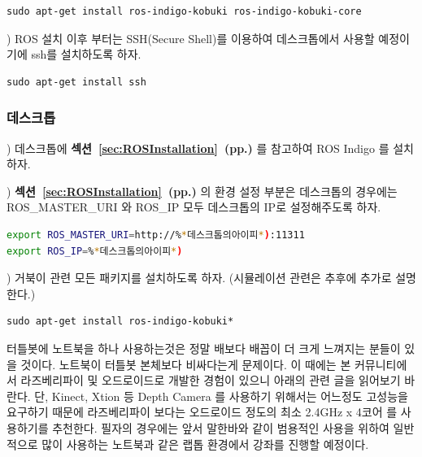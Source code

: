 \begin{lstlisting}[language=ROS]
sudo apt-get install ros-indigo-kobuki ros-indigo-kobuki-core
\end{lstlisting}

\vspace{\baselineskip}
\noindent{}
\thenum) ROS 설치 이후 부터는 SSH(Secure Shell)를 이용하여 데스크톱에서 사용할 예정이기에  ssh를 설치하도록 하자.

\begin{lstlisting}[language=ROS]
sudo apt-get install ssh
\end{lstlisting}

\subsubsection{데스크톱}

\vspace{\baselineskip}
\noindent{}
\thenum) 데스크톱에 \textbf{섹션~\ref{sec:ROSInstallation}~(pp.\pageref{sec:ROSInstallation})} 를 참고하여 ROS Indigo 를 설치하자. 

\vspace{\baselineskip}
\noindent{}
\thenum) \textbf{섹션~\ref{sec:ROSInstallation}~(pp.\pageref{sec:ROSInstallation})} 의 환경 설정 부분은 데스크톱의 경우에는 ROS\_MASTER\_URI 와 ROS\_IP 모두 데스크톱의 IP로 설정해주도록 하자. 

\begin{lstlisting}[language=bash]
export ROS_MASTER_URI=http://%*데스크톱의아이피*):11311
export ROS_IP=%*데스크톱의아이피*)
\end{lstlisting}

\vspace{\baselineskip}
\noindent{}
\thenum) 거북이 관련 모든 패키지를 설치하도록 하자. (시뮬레이션 관련은 추후에 추가로 설명한다.)

\begin{lstlisting}[language=ROS]
sudo apt-get install ros-indigo-kobuki*
\end{lstlisting}

\begin{corollary}
터틀봇에 노트북을 하나 사용하는것은 정말 배보다 배꼽이 더 크게 느껴지는 분들이 있을 것이다. 노트북이 터틀봇 본체보다 비싸다는게 문제이다. 이 때에는 본 커뮤니티에서 라즈베리파이 및 오드로이드로 개발한 경험이 있으니 아래의 관련 글을 읽어보기 바란다. 단, Kinect, Xtion 등 Depth Camera 를 사용하기 위해서는 어느정도 고성능을 요구하기 때문에 라즈베리파이 보다는 오드로이드 정도의 최소 2.4GHz x 4코어 를 사용하기를 추천한다. 필자의 경우에는 앞서 말한바와 같이 범용적인 사용을 위하여 일반적으로 많이 사용하는 노트북과 같은 랩톱 환경에서 강좌를 진행할 예정이다. 
\end{corollary}

